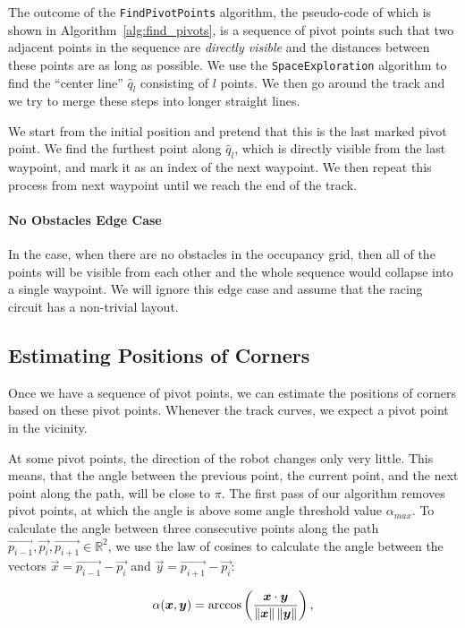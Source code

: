 The outcome of the \texttt{FindPivotPoints} algorithm, the pseudo-code of which is shown in Algorithm~\ref{alg:find_pivots}, is a sequence of pivot points such that two adjacent points in the sequence are \textit{directly visible} and the distances between these points are as long as possible. We use the \texttt{SpaceExploration} algorithm to find the ``center line'' $\hat{q}_l$ consisting of $l$ points. We then go around the track and we try to merge these steps into longer straight lines.

We start from the initial position and pretend that this is the last marked pivot point. We find the furthest point along $\hat{q}_l$, which is directly visible from the last waypoint, and mark it as an index of the next waypoint. We then repeat this process from next waypoint until we reach the end of the track.

\paragraph{No Obstacles Edge Case} In the case, when there are no obstacles in the occupancy grid, then all of the points will be visible from each other and the whole sequence would collapse into a single waypoint. We will ignore this edge case and assume that the racing circuit has a non-trivial layout.

\subsection{Estimating Positions of Corners}

Once we have a sequence of pivot points, we can estimate the positions of corners based on these pivot points. Whenever the track curves, we expect a pivot point in the vicinity.

At some pivot points, the direction of the robot changes only very little. This means, that the angle between the previous point, the current point, and the next point along the path, will be close to $\pi$. The first pass of our algorithm removes pivot points, at which the angle is above some angle threshold value $\alpha_{max}$. To calculate the angle between three consecutive points along the path $\vec{p_{i-1}}, \vec{p_i}, \vec{p_{i+1}}\in\mathbb{R}^2$, we use the law of cosines to calculate the angle between the vectors $\vec{x}=\vec{p_{i-1}}-\vec{p_i}$ and $\vec{y}=\vec{p_{i+1}}-\vec{p_i}$:

\[
	\alpha(\bm{x}, \bm{y})=\arccos \left(\dfrac{\bm{x}\cdot\bm{y}}{\left\lVert\bm{x}\right\rVert\left\lVert\bm{y}\right\rVert}\right),
\]

